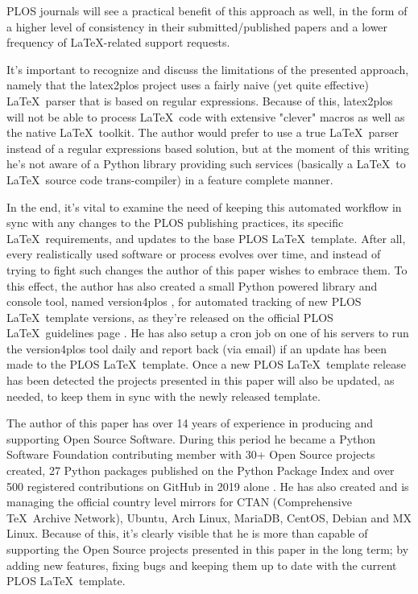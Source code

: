 PLOS journals will see a practical benefit of this approach as well, in the form of a higher level of consistency in their submitted/published papers and a lower frequency of \LaTeX-related support requests.

It's important to recognize and discuss the limitations of the presented approach, namely that the latex2plos project uses a fairly naive (yet quite effective) \LaTeX~parser that is based on regular expressions.
Because of this, latex2plos will not be able to process \LaTeX~code with extensive "clever" macros as well as the native \LaTeX~toolkit.
The author would prefer to use a true \LaTeX~parser instead of a regular expressions based solution, but at the moment of this writing he's not aware of a Python library providing such services (basically a \LaTeX~to \LaTeX~source code trans-compiler) in a feature complete manner.

In the end, it's vital to examine the need of keeping this automated workflow in sync with any changes to the PLOS publishing practices, its specific \LaTeX~requirements, and updates to the base PLOS \LaTeX~template.
After all, every realistically used software or process evolves over time, and instead of trying to fight such changes the author of this paper wishes to embrace them.
To this effect, the author has also created a small Python powered library and console tool, named version4plos \cite{version4plos}, for automated tracking of new PLOS \LaTeX~template versions, as they're released on the official PLOS \LaTeX~guidelines page \cite{PLOS:LaTeX}.
He has also setup a cron job on one of his servers to run the version4plos tool daily and report back (via email) if an update has been made to the PLOS \LaTeX~template.
Once a new PLOS \LaTeX~template release has been detected the projects presented in this paper will also be updated, as needed, to keep them in sync with the newly released template.

The author of this paper has over 14 years of experience in producing and supporting Open Source Software.
During this period he became a Python Software Foundation contributing member with 30+ Open Source projects created, 27 Python packages published on the Python Package Index and over 500 registered contributions on GitHub in 2019 alone \cite{Maric:GitHub, Maric:PyPI}.
He has also created and is managing the official country level mirrors for CTAN (Comprehensive \TeX~Archive Network), Ubuntu, Arch Linux, MariaDB, CentOS, Debian and MX Linux.
Because of this, it's clearly visible that he is more than capable of supporting the Open Source projects presented in this paper in the long term; by adding new features, fixing bugs and keeping them up to date with the current PLOS \LaTeX~template.
